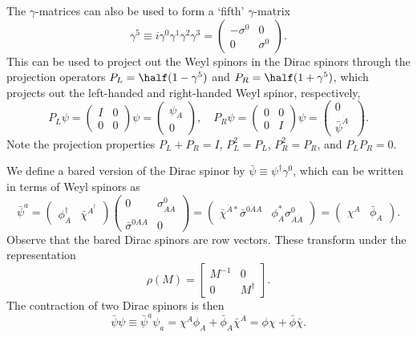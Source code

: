 \documentclass[notes.tex]{subfiles}
\begin{document}
The $\gamma$-matrices can also be used to form a `fifth'  $\gamma$-matrix
\[ \gamma^5\equiv i\gamma^0\gamma^1\gamma^2\gamma^3=\left(\begin{matrix} -\sigma^0 & 0 \\ 0 & \sigma^0 \end{matrix}\right). \]
This can be used to project out the Weyl spinors in the Dirac spinors through the projection operators $P_L=\half(1-\gamma^5)$ and $P_R=\half(1+\gamma^5)$, which projects out the left-handed and right-handed Weyl spinor, respectively,
\[ P_L \psi=\left(\begin{matrix} I & 0 \\ 0 & 0 \end{matrix}\right) \psi=\begin{pmatrix} \psi_A \\ 0 \end{pmatrix}, \quad
P_R \psi=\left(\begin{matrix} 0 & 0 \\ 0 & I \end{matrix}\right) \psi=\begin{pmatrix} 0\\  \bar{\psi}^{\dot{A}}\ \end{pmatrix}.
\]
Note the projection properties $P_L+P_R=I$, $P_L^2=P_L$, $P_R^2=P_R$, and $P_LP_R=0$.

We define a bared version of the Dirac spinor by  $\bar\psi \equiv \psi^\dagger\gamma^0$, which can be written in terms of Weyl spinors as 
\begin{equation*}
\bar\psi^a  =\begin{pmatrix}\phi_A^\dagger & \bar{\chi}^{\dot{A}^\dagger}\end{pmatrix} \left(\begin{matrix} 0 & \sigma^0_{A\dot{A}} \\ \bar\sigma^{0\dot A A} & 0 \end{matrix}\right)
= \begin{pmatrix}  \bar{\chi}^{\dot{A}*}\bar\sigma^{0\dot A A}  & \phi_A^*  \sigma^0_{A\dot{A}} \end{pmatrix}
= \begin{pmatrix}  \chi^A & \bar{\phi}_{\dot A} \end{pmatrix}.
\end{equation*}
Observe that the bared Dirac spinors are row vectors. These transform under the representation
\[ \rho(M)=\left[\begin{matrix} M^{-1} & 0 \\ 0 & M^\dagger \end{matrix}\right]. \]
The contraction of two Dirac spinors is then
\[ \bar\psi \psi \equiv \bar\psi^a \psi_a = \chi^A  \phi_A   + \bar{\phi}_{\dot A} \bar{\chi}^{\dot{A}} =\phi\chi +\bar\phi\bar\chi.\]
\end{document}
